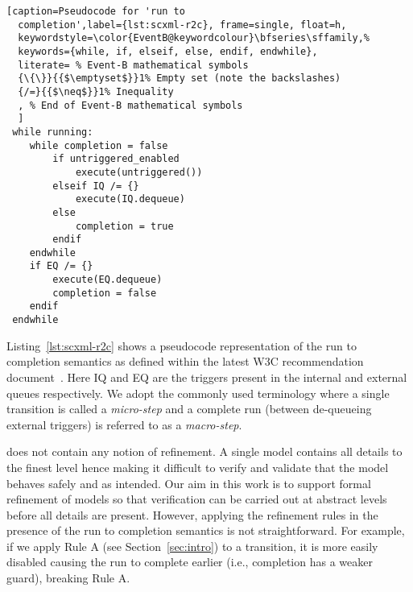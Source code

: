 \begin{lstlisting}[caption=Pseudocode for 'run to
  completion',label={lst:scxml-r2c}, frame=single, float=h,
  keywordstyle=\color{EventB@keywordcolour}\bfseries\sffamily,%
  keywords={while, if, elseif, else, endif, endwhile},
  literate= % Event-B mathematical symbols
  {\{\}}{{$\emptyset$}}1% Empty set (note the backslashes)
  {/=}{{$\neq$}}1% Inequality
  , % End of Event-B mathematical symbols
  ]
 while running:
 	while completion = false
 		if untriggered_enabled
 			execute(untriggered())
 		elseif IQ /= {}
 			execute(IQ.dequeue)
 		else
 			completion = true
 		endif
 	endwhile
 	if EQ /= {}
 		execute(EQ.dequeue) 
 		completion = false
 	endif
 endwhile 
\end{lstlisting}

Listing~\ref{lst:scxml-r2c} shows a pseudocode representation of the run to completion semantics as defined within the latest W3C recommendation document~\cite{scxmlwebsite}. Here IQ and EQ are the triggers present in the internal and external queues respectively. We adopt the commonly used terminology where a single transition is called a \emph{micro-step} and a complete run (between de-queueing external triggers) is referred to as a \emph{macro-step}.

\SCXML does not contain any notion of refinement. 
A single model contains all details to the finest level hence making it difficult to verify and validate that the model behaves safely and as intended.
Our aim in this work is to support formal refinement of \SCXML models so that verification can be carried out at abstract levels before all details are present.
However, applying the refinement rules in the presence of the run to completion semantics is not straightforward.
For example, if we apply Rule A (see Section~\ref{sec:intro}) to a transition, it is more easily disabled causing the run to complete earlier (i.e., completion has a weaker guard), breaking Rule A.


